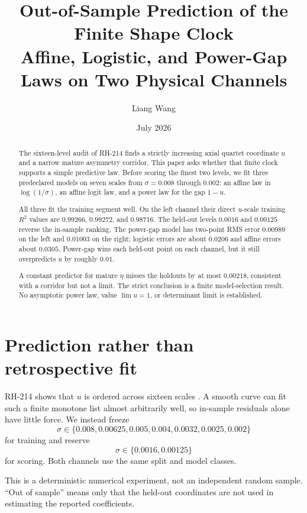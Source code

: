\documentclass[12pt]{article}
\title{Out-of-Sample Prediction of the Finite Shape Clock\\
\large Affine, Logistic, and Power-Gap Laws on Two Physical Channels}
\author{Liang Wang}\date{July 2026}
\theoremstyle{remark}\newtheorem{remark}[theorem]{Remark}
\begin{document}
\maketitle
\begin{abstract}
The sixteen-level audit of RH-214 finds a strictly increasing axial quartet
coordinate $u$ and a narrow mature asymmetry corridor.  This paper asks
whether that finite clock supports a simple predictive law.  Before scoring
the finest two levels, we fit three predeclared models on seven scales from
$\sigma=0.008$ through $0.002$: an affine law in $\log(1/\sigma)$, an affine
logit law, and a power law for the gap $1-u$.

All three fit the training segment well.  On the left channel their direct
$u$-scale training $R^2$ values are $0.99266$, $0.99272$, and $0.98716$.
The held-out levels $0.0016$ and $0.00125$ reverse the in-sample ranking.
The power-gap model has two-point RMS error $0.00989$ on the left and
$0.01003$ on the right; logistic errors are about $0.0206$ and affine errors
about $0.0305$.  Power-gap wins each held-out point on each channel, but it
still overpredicts $u$ by roughly $0.01$.

A constant predictor for mature $\eta$ misses the holdouts by at most
$0.00218$, consistent with a corridor but not a limit.  The strict conclusion
is a finite model-selection result.  No asymptotic power law, value
$\lim u=1$, or determinant limit is established.
\end{abstract}

\section{Prediction rather than retrospective fit}

RH-214 shows that $u$ is ordered across sixteen scales
\citep{WangRH214}.  A smooth curve can fit such a finite monotone list almost
arbitrarily well, so in-sample residuals alone have little force.  We instead
freeze
\begin{equation}\label{eq:train}
 \sigma\in\{0.008,0.00625,0.005,0.004,0.0032,0.0025,0.002\}
\end{equation}
for training and reserve
\begin{equation}\label{eq:holdout}
 \sigma\in\{0.0016,0.00125\}
\end{equation}
for scoring.  Both channels use the same split and model classes.

This is a deterministic numerical experiment, not an independent random
sample.  ``Out of sample'' means only that the held-out coordinates are not
used in estimating the reported coefficients.
\end{document}
